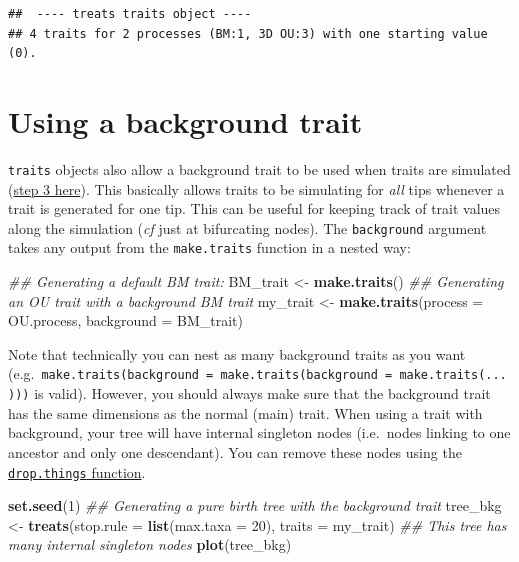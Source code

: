 \documentclass[
]{book}
\newenvironment{Shaded}{\begin{snugshade}}{\end{snugshade}}
\newcommand{\CommentTok}[1]{\textcolor[rgb]{0.56,0.35,0.01}{\textit{#1}}}
\newcommand{\DataTypeTok}[1]{\textcolor[rgb]{0.13,0.29,0.53}{#1}}
\newcommand{\DecValTok}[1]{\textcolor[rgb]{0.00,0.00,0.81}{#1}}
\newcommand{\KeywordTok}[1]{\textcolor[rgb]{0.13,0.29,0.53}{\textbf{#1}}}
\newcommand{\NormalTok}[1]{#1}
\newcommand{\StringTok}[1]{\textcolor[rgb]{0.31,0.60,0.02}{#1}}
\begin{document}
\begin{verbatim}
##  ---- treats traits object ---- 
## 4 traits for 2 processes (BM:1, 3D OU:3) with one starting value (0).
\end{verbatim}

\hypertarget{using-a-background-trait}{%
\section{Using a background trait}\label{using-a-background-trait}}

\texttt{traits} objects also allow a background trait to be used when traits are simulated (\protect\hyperlink{bdalgorithm}{step 3 here}).
This basically allows traits to be simulating for \emph{all} tips whenever a trait is generated for one tip.
This can be useful for keeping track of trait values along the simulation (\emph{cf} just at bifurcating nodes).
The \texttt{background} argument takes any output from the \texttt{make.traits} function in a nested way:

\begin{Shaded}
\begin{Highlighting}[]
\CommentTok{\#\# Generating a default BM trait:}
\NormalTok{BM\_trait \textless{}{-}}\StringTok{ }\KeywordTok{make.traits}\NormalTok{()}
\CommentTok{\#\# Generating an OU trait with a background BM trait}
\NormalTok{my\_trait \textless{}{-}}\StringTok{ }\KeywordTok{make.traits}\NormalTok{(}\DataTypeTok{process =}\NormalTok{ OU.process, }\DataTypeTok{background =}\NormalTok{ BM\_trait) }
\end{Highlighting}
\end{Shaded}

Note that technically you can nest as many background traits as you want (e.g.~\texttt{make.traits(background\ =\ make.traits(background\ =\ make.traits(...)))} is valid).
However, you should always make sure that the background trait has the same dimensions as the normal (main) trait.
When using a trait with background, your tree will have internal singleton nodes (i.e.~nodes linking to one ancestor and only one descendant).
You can remove these nodes using the \protect\hyperlink{dropthings}{\texttt{drop.things} function}.

\begin{Shaded}
\begin{Highlighting}[]
\KeywordTok{set.seed}\NormalTok{(}\DecValTok{1}\NormalTok{)}
\CommentTok{\#\# Generating a pure birth tree with the background trait}
\NormalTok{tree\_bkg \textless{}{-}}\StringTok{ }\KeywordTok{treats}\NormalTok{(}\DataTypeTok{stop.rule =} \KeywordTok{list}\NormalTok{(}\DataTypeTok{max.taxa =} \DecValTok{20}\NormalTok{),}
                 \DataTypeTok{traits    =}\NormalTok{ my\_trait)}
\CommentTok{\#\# This tree has many internal singleton nodes}
\KeywordTok{plot}\NormalTok{(tree\_bkg)}
\end{Highlighting}
\end{Shaded}
\end{document}
